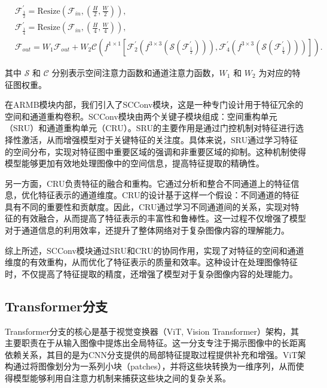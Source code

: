 \documentclass[a4paper]{ctexart}
\begin{document}
\begin{equation}
	\begin{aligned}
		&\mathcal{F}^\prime_{\frac{1}{2}} = \text{Resize}\left(\mathcal{F}_{in},\left(\frac{H}{2},\frac{W}{2}\right)\right), \\
		&\mathcal{F}^\prime_{\frac{1}{4}} = \text{Resize}\left(\mathcal{F}_{in},\left(\frac{H}{4},\frac{W}{4}\right)\right), \\
		&\mathcal{F}_{out} = W_1\mathcal{F}_{out} + W_2\mathcal{C} \left( f^{1 \times 1}  \left[\mathcal{F}^\prime_2 (f^{3 \times 3}(\mathcal{S}(\mathcal{F}^\prime_{\frac{1}{2}}))), \mathcal{F}^\prime_4 (f^{3 \times 3}(\mathcal{S}(\mathcal{F}^\prime_{\frac{1}{4}})))\right] \right).
	\end{aligned}
	\label{eq: ARMB}
\end{equation}

其中 $\mathcal{S}$ 和 $\mathcal{C}$ 分别表示空间注意力函数和通道注意力函数，$W_1$ 和 $W_2$ 为对应的特征图权重。

在ARMB模块内部，我们引入了SCConv模块，这是一种专门设计用于特征冗余的空间和通道重构卷积。SCConv模块由两个关键子模块组成：空间重构单元（SRU）和通道重构单元（CRU）。SRU的主要作用是通过门控机制对特征进行选择性激活，从而增强模型对于关键特征的关注度。具体来说，SRU通过学习特征的空间分布，实现对特征图中重要区域的强调和非重要区域的抑制。这种机制使得模型能够更加有效地处理图像中的空间信息，提高特征提取的精确性。

另一方面，CRU负责特征的融合和重构。它通过分析和整合不同通道上的特征信息，优化特征表示的通道维度。CRU的设计基于这样一个假设：不同通道的特征具有不同的重要性和贡献度。因此，CRU通过学习不同通道间的关系，实现对特征的有效融合，从而提高了特征表示的丰富性和鲁棒性。这一过程不仅增强了模型对于通道信息的利用效率，还提升了整体网络对于复杂图像内容的理解能力。

综上所述，SCConv模块通过SRU和CRU的协同作用，实现了对特征的空间和通道维度的有效重构，从而优化了特征表示的质量和效率。这种设计在处理图像特征时，不仅提高了特征提取的精度，还增强了模型对于复杂图像内容的处理能力。
	
\subsection{Transformer分支}
	
Transformer分支的核心是基于视觉变换器（ViT, Vision Transformer）架构，其主要职责在于从输入图像中提炼出全局特征。这一分支专注于揭示图像中的长距离依赖关系，其目的是为CNN分支提供的局部特征提取过程提供补充和增强。ViT架构通过将图像划分为一系列小块（patches），并将这些块转换为一维序列，从而使得模型能够利用自注意力机制来捕获这些块之间的复杂关系。
	
\end{document}
